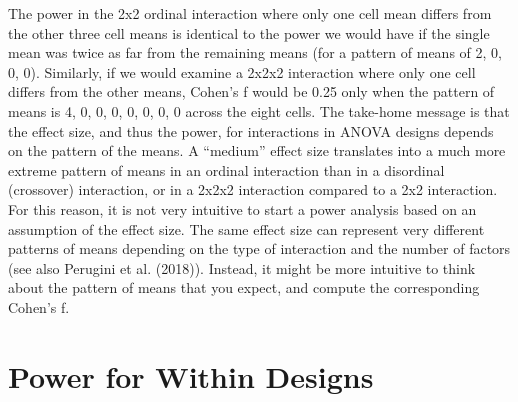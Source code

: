 \documentclass[,jou, draftfirst, a4paper,floatsintext]{apa6}
\begin{document}
The power in the 2x2 ordinal interaction where only one cell mean differs from the other three cell means is identical to the power we would have if the single mean was twice as far from the remaining means (for a pattern of means of 2, 0, 0, 0).
Similarly, if we would examine a 2x2x2 interaction where only one cell differs from the other means, Cohen's f would be 0.25 only when the pattern of means is 4, 0, 0, 0, 0, 0, 0, 0 across the eight cells. The take-home message is that the effect size, and thus the power, for interactions in ANOVA designs depends on the pattern of the means.
A \enquote{medium} effect size translates into a much more extreme pattern of means in an ordinal interaction than in a disordinal (crossover) interaction, or in a 2x2x2 interaction compared to a 2x2 interaction.
For this reason, it is not very intuitive to start a power analysis based on an assumption of the effect size.
The same effect size can represent very different patterns of means depending on the type of interaction and the number of factors (see also Perugini et al. (2018)).
Instead, it might be more intuitive to think about the pattern of means that you expect, and compute the corresponding Cohen's f.~

\hypertarget{power-for-within-designs}{%
\section{Power for Within Designs}\label{power-for-within-designs}}
\end{document}
